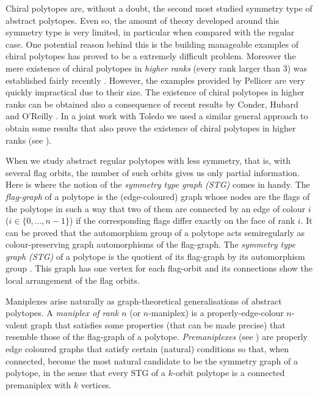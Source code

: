 Chiral polytopes are, without a doubt, the second most studied symmetry type of abstract polytopes. 
Even so, the amount of theory developed around this symmetry type is very limited, in particular when compared with the regular case. 
One potential reason behind this is the building manageable examples of chiral polytopes has proved to be a extremely difficult problem. 
Moreover the mere existence of chiral polytopes in \emph{higher ranks} (every rank larger than $3$) was established fairly recently \cite{Pellicer2010_ConstructionHigherRank}. 
However, the examples provided by Pellicer are very quickly impractical due to their size.
The existence of chiral polytopes in higher ranks can be obtained also a consequence of recent results by Conder, Hubard and O'Reilly \cite*{CondHubORe2024_ConstructionChiralPolytopes}.
In a joint work with Toledo we used a similar general approach to obtain some results that also prove the existence of chiral polytopes in higher ranks (see \cite{MonteToled_ChiralExtensionsRegular_preprint}). 

When we study abstract regular polytopes with less symmetry, that is, with several flag orbits, the number of such orbits gives us only  partial information. 
Here is where the notion of the \emph{symmetry type graph (STG)} comes in handy. 
The \emph{flag-graph} of a polytope is the (edge-coloured) graph whose nodes are the flags of the polytope in such a way that two of them are connected by an edge of colour $i$ ($i \in \{0, \dots, n-1\}$) if the corresponding flags differ exactly on the face of rank $i$.
It can be proved that the automorphism group of a polytope acts semiregularly as colour-preserving graph automorphisms of the flag-graph. 
The \emph{symmetry type graph (STG)} of a polytope is the quotient of its flag-graph by its automorphism group
\cite{CunDelHuTo2015_SymmetryTypeGraphs}.
This graph has one vertex for each flag-orbit and its connections show the local arrangement of the flag orbits. 

Maniplexes arise naturally as graph-theoretical generalisations of abstract polytopes. 
A \emph{maniplex of rank $n$} (or $n$-maniplex) is a properly-edge-colour $n$-valent graph that satisfies some properties (that can be made precise) that resemble those of the flag-graph of a polytope.
\emph{Premaniplexes} (see \cite{HubaMocMon2023_VoltageOperationsManiplexes,HubarMocha2023_AllPolytopesAre}) are properly edge coloured graphs that satisfy certain (natural) conditions so that, when connected, become the most natural candidate to be the symmetry graph of a polytope, in the sense that every STG of a $k$-orbit polytope is a connected premaniplex with $k$ vertices.

